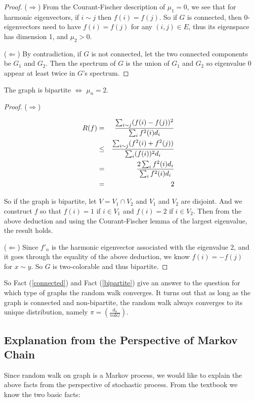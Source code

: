 \begin{proof}
($\Rightarrow$) From the Courant-Fischer description of $\mu_1=0$,
we see that for harmonic eigenvectors, if $i\sim j$ then
$f(i)=f(j)$. So if $G$ is connected, then 0-eigenvectors need to
have $f(i)=f(j)$ for any $(i, j)\in E$, thus its eigenspace has
dimension 1, and $\mu_2>0$.

($\Leftarrow$) By contradiction, if $G$ is not connected, let the
two connected components be $G_1$ and $G_2$. Then the spectrum of
$G$ is the union of $G_1$ and $G_2$ so eigenvalue 0 appear at least
twice in $G$'s spectrum.
\end{proof}

\begin{fact} \label{bipartite}
The graph is bipartite $\Leftrightarrow$ $\mu_n=2$.
\end{fact}

\begin{proof}
($\Rightarrow$)

\begin{eqnarray*}
R(f) & = & \frac{\sum_{i\sim
j} (f(i)-f(j))^2}{\sum_i f^2(i) d_i} \\
& \leq & {{\sum_{i\sim j} (f^2(i)+f^2(j))}\over{\sum_i (f(i))^2 d_i}} \\
& = & \frac{2\sum_i f^2(i) d_i}{\sum_i f^2(i) d_i} \\
& = & 2
\end{eqnarray*}

So if the graph is bipartite, let $V=V_1 \cap V_2$ and $V_1$ and
$V_2$ are disjoint. And we construct $f$ so that $f(i)=1$ if $i\in
V_1$ and $f(i)=2$ if $i\in V_2$. Then from the above deduction and
using the Courant-Fischer lemma of the largest eigenvalue, the
result holds.

($\Leftarrow$) Since $f'_n$ is the harmonic eigenvector associated
with the eigenvalue 2, and it goes through the equality of the above
deduction, we know $f(i)=-f(j)$ for $x\sim y$. So $G$ is
two-colorable and thus bipartite.
\end{proof}

So Fact (\ref{connected}) and Fact (\ref{bipartite}) give an answer
to the question for which type of graphs the random walk converges.
It turns out that as long as the graph is connected and
non-bipartite, the random walk always converges to its unique
distribution, namely $\pi=(\frac{d_u}{\text{vol}G})$.

\subsection{Explanation from the Perspective of Markov Chain}
Since random walk on graph is a Markov process, we would like to
explain the above facts from the perspective of stochastic process.
From the textbook we know the two basic facts:

